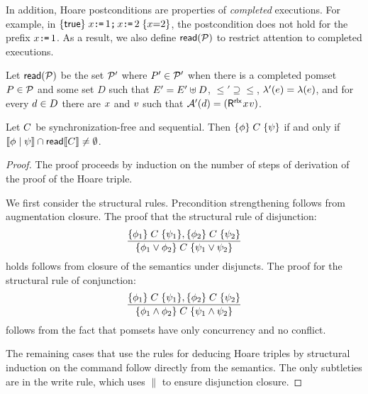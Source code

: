 In addition, Hoare postconditions are properties of \emph{completed} executions.
For example, in $\{\mathsf{true}\}\allowbreak\;x\texttt{:}\mkern-1mu\texttt{=}\,1\texttt{;}\,\allowbreak x\texttt{:}\mkern-1mu\texttt{=}\,2\;\allowbreak\{x{=}2\}$, the postcondition
does not hold for the prefix $x\texttt{:}\mkern-1mu\texttt{=}\,1$.  As a result, we also define
${\mathsf{read}}(\mathcal{P})$ to restrict attention to completed executions.  %


Let ${\mathsf{read}}(\mathcal{P})$ be the set $\mathcal{P}'$ where $P'\in\mathcal{P}'$ when there is
a completed pomset $P\in\mathcal{P}$ and some set $D$ such that
$E'= E'\uplus D$, ${\le'} \supseteq{\le}$,
$\lambda'(e) = \lambda(e)$, and for every $d\in D$ there are
$x$ and $v$ such that
$\labelingAct'(\bEv)=(\DR[\modeRLX]{\aLoc}{\aVal})$.

\begin{theorem}
  \label{thm:hoare}
  Let $C$ be synchronization-free and sequential.  Then
  $\{\phi\}\allowbreak\;C\;\allowbreak\{\psi\}$ if and only if
  $\llbracket\phi\mid\psi\rrbracket\cap\mathsf{read}\llbracket C\rrbracket\neq\emptyset$.
\begin{proof}
  The proof proceeds by induction on the number of steps of derivation of the
  proof of the Hoare triple.

  We first consider the structural rules.  Precondition strengthening follows
  from augmentation closure.  The proof that the structural rule of
  disjunction:
  \begin{displaymath}
    \frac{\{\phi_1\}\allowbreak\;C\;\allowbreak\{\psi_1\},  \{\phi_2\}\allowbreak\;C\;\allowbreak\{\psi_2\}}{ \{\phi_1 \lor \phi_2\}\allowbreak\;C\;\allowbreak\{\psi_1\lor \psi_2\}} 
  \end{displaymath}
  holds  follows from closure of the semantics under disjuncts. The proof for the structural rule of conjunction:
  \begin{displaymath}
    \frac{\{\phi_1\}\allowbreak\;C\;\allowbreak\{\psi_1\},  \{\phi_2\}\allowbreak\;C\;\allowbreak\{\psi_2\}}{ \{\phi_1 \land \phi_2\}\allowbreak\;C\;\allowbreak\{\psi_1\land \psi_2\}} 
  \end{displaymath}
  follows from the fact that pomsets have only concurrency and no conflict.  

  The remaining cases that use the rules for deducing Hoare triples by
  structural induction on the command follow directly from the semantics.
  The only subtleties are in the write rule, which uses $\parallel$ to ensure
  disjunction closure.
\end{proof}
\end{theorem}

